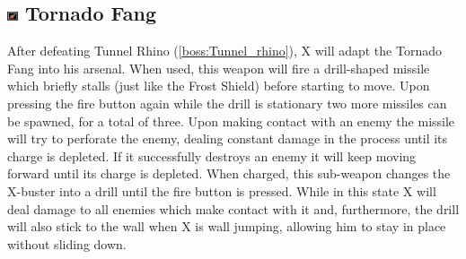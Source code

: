 \subsection{\includegraphics[width=12px, height=10px]{figures/X3/weapons/T_fang.jpg} Tornado Fang}\label{Tornado_Fang}
After defeating Tunnel Rhino (\ref{boss:Tunnel_rhino}), X will adapt the Tornado Fang into his arsenal. When used, this weapon will fire a drill-shaped missile which briefly stalls (just like the Frost Shield) before starting to move. Upon pressing the fire button again while the drill is stationary two more missiles can be spawned, for a total of three. Upon making contact with an enemy the missile will try to perforate the enemy, dealing constant damage in the process until its charge is depleted. If it successfully destroys an enemy it will keep moving forward until its charge is depleted. When charged, this sub-weapon changes the X-buster into a drill until the fire button is pressed. While in this state X will deal damage to all enemies which make contact with it and, furthermore, the drill will also stick to the wall when X is wall jumping, allowing him to stay in place without sliding down.

